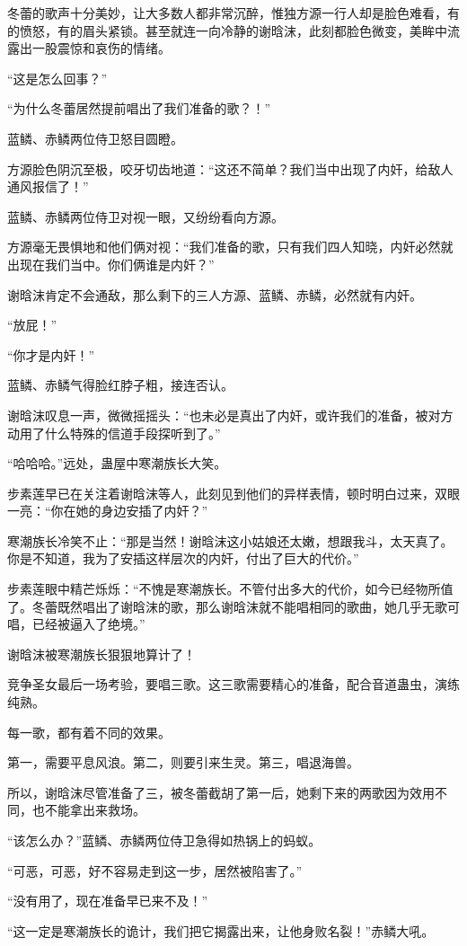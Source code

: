 \begin{this_body}
冬蕾的歌声十分美妙，让大多数人都非常沉醉，惟独方源一行人却是脸色难看，有的愤怒，有的眉头紧锁。甚至就连一向冷静的谢晗沫，此刻都脸色微变，美眸中流露出一股震惊和哀伤的情绪。

“这是怎么回事？”

“为什么冬蕾居然提前唱出了我们准备的歌？！”

蓝鳞、赤鳞两位侍卫怒目圆瞪。

方源脸色阴沉至极，咬牙切齿地道：“这还不简单？我们当中出现了内奸，给敌人通风报信了！”

蓝鳞、赤鳞两位侍卫对视一眼，又纷纷看向方源。

方源毫无畏惧地和他们俩对视：“我们准备的歌，只有我们四人知晓，内奸必然就出现在我们当中。你们俩谁是内奸？”

谢晗沫肯定不会通敌，那么剩下的三人方源、蓝鳞、赤鳞，必然就有内奸。

“放屁！”

“你才是内奸！”

蓝鳞、赤鳞气得脸红脖子粗，接连否认。

谢晗沫叹息一声，微微摇摇头：“也未必是真出了内奸，或许我们的准备，被对方动用了什么特殊的信道手段探听到了。”

“哈哈哈。”远处，蛊屋中寒潮族长大笑。

步素莲早已在关注着谢晗沫等人，此刻见到他们的异样表情，顿时明白过来，双眼一亮：“你在她的身边安插了内奸？”

寒潮族长冷笑不止：“那是当然！谢晗沫这小姑娘还太嫩，想跟我斗，太天真了。你是不知道，我为了安插这样层次的内奸，付出了巨大的代价。”

步素莲眼中精芒烁烁：“不愧是寒潮族长。不管付出多大的代价，如今已经物所值了。冬蕾既然唱出了谢晗沫的歌，那么谢晗沫就不能唱相同的歌曲，她几乎无歌可唱，已经被逼入了绝境。”

谢晗沫被寒潮族长狠狠地算计了！

竞争圣女最后一场考验，要唱三歌。这三歌需要精心的准备，配合音道蛊虫，演练纯熟。

每一歌，都有着不同的效果。

第一，需要平息风浪。第二，则要引来生灵。第三，唱退海兽。

所以，谢晗沫尽管准备了三，被冬蕾截胡了第一后，她剩下来的两歌因为效用不同，也不能拿出来救场。

“该怎么办？”蓝鳞、赤鳞两位侍卫急得如热锅上的蚂蚁。

“可恶，可恶，好不容易走到这一步，居然被陷害了。”

“没有用了，现在准备早已来不及！”

“这一定是寒潮族长的诡计，我们把它揭露出来，让他身败名裂！”赤鳞大吼。


\end{this_body}
